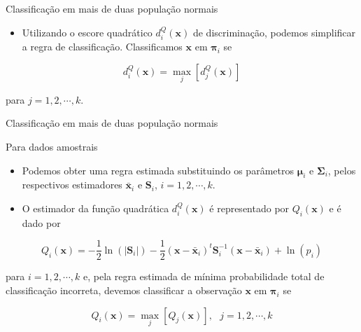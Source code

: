\documentclass[
  ignorenonframetext,
  aspectratio=169,
]{beamer}
\providecommand{\tightlist}{%
  \setlength{\itemsep}{0pt}\setlength{\parskip}{0pt}}
\begin{document}
\begin{frame}{Classificação em mais de duas população normais}
\label{classificauxe7uxe3o-em-mais-de-duas-populauxe7uxe3o-normais-3}
\begin{itemize}
\tightlist
\item
  Utilizando o escore quadrático \(d_i^Q(\boldsymbol{x})\) de
  discriminação, podemos simplificar a regra de classificação.
  Classificamos \(\boldsymbol{x}\) em \(\boldsymbol{\pi}_i\) se
\end{itemize}

\[d_i^Q(\boldsymbol{x}) = \max_j \left[ d_j^Q(\boldsymbol{x})\right]\]

para \(j = 1, 2, \cdots, k\).
\end{frame}

\begin{frame}{Classificação em mais de duas população normais}
\label{classificauxe7uxe3o-em-mais-de-duas-populauxe7uxe3o-normais-4}
\begin{block}{Para dados amostrais}
\label{para-dados-amostrais-3}
\begin{itemize}
\item
  Podemos obter uma regra estimada substituindo os parâmetros
  \(\boldsymbol{\mu}_i\) e \(\boldsymbol{\Sigma}_i\), pelos respectivos
  estimadores \(\bar{\boldsymbol{x}}_i\) e \(\boldsymbol{S}_i\),
  \(i = 1,2, \cdots, k\).
\item
  O estimador da função quadrática \(d_i^Q(\boldsymbol{x})\) é
  representado por \(Q_i(\boldsymbol{x})\) e é dado por
\end{itemize}

\[
Q_i(\boldsymbol{x}) =  - \dfrac{1}{2} \ln \left( |\boldsymbol{S}_i|\right) - \dfrac{1}{2} \left( \boldsymbol{x} - \bar{\boldsymbol{x}}_i\right) ^t \boldsymbol{S}_i^{-1} \left( \boldsymbol{x} - \bar{\boldsymbol{x}}_i\right) + \ln\left( p_i\right) 
\]

para \(i = 1, 2, \cdots, k\) e, pela regra estimada de mínima
probabilidade total de classificação incorreta, devemos classificar a
observação \(\boldsymbol{x}\) em \(\boldsymbol{\pi}_i\) se

\[Q_i(\boldsymbol{x}) = \max_j \left[Q_j(\boldsymbol{x})\right], \,\,\,\, j = 1, 2, \cdots, k\]
\end{block}
\end{frame}
\end{document}
